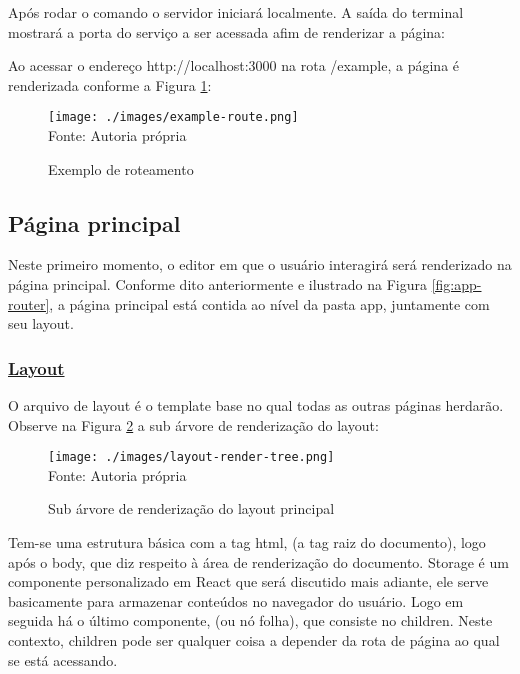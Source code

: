 Após rodar o comando o servidor iniciará localmente.
A saída do terminal mostrará a porta do serviço a ser acessada
afim de renderizar a página:


Ao acessar o endereço http://localhost:3000
na rota /example, a página é renderizada
conforme a
Figura \ref{fig:example-route}:

\begin{figure}[H]
    \centering
    \caption{Exemplo de roteamento}
    \texttt{[image: ./images/example-route.png]}
    \label{fig:example-route} \\
    \textnormal{\fontsize{10pt}{12pt}Fonte: Autoria própria}
\end{figure}

\subsection{Página principal}

Neste primeiro momento, o editor em que o usuário interagirá
será renderizado na página principal. Conforme dito anteriormente
e ilustrado na
Figura \ref{fig:app-router},
a página principal está contida ao nível da pasta app, juntamente com
seu layout.

\subsubsection{\underline{Layout}}

O arquivo de layout é o template base no qual todas as outras páginas herdarão.
Observe na
Figura \ref{fig:layout-render-tree}
a sub árvore de renderização do layout:

\begin{figure}[H]
    \centering
    \caption{Sub árvore de renderização do layout principal}
    \texttt{[image: ./images/layout-render-tree.png]}
    \label{fig:layout-render-tree} \\
    \textnormal{\fontsize{10pt}{12pt}Fonte: Autoria própria}
\end{figure}

Tem-se uma estrutura básica com a tag html, (a tag raiz do documento),
logo após o body, que diz respeito à área de renderização do documento.
Storage é um componente personalizado em React que será discutido mais adiante,
ele serve basicamente para armazenar conteúdos no navegador do usuário.
Logo em seguida há o último componente, (ou nó folha), que consiste no
children. Neste contexto, children pode ser qualquer coisa a depender
da rota de página ao qual se está acessando.

